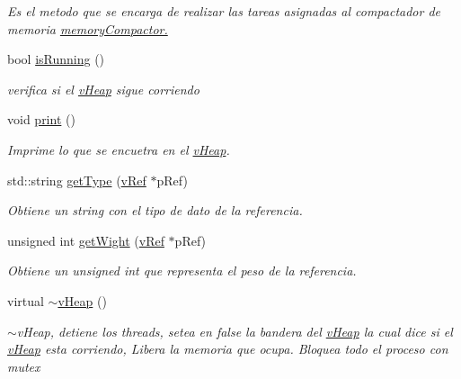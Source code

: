 \begin{DoxyCompactItemize}
\begin{DoxyCompactList}\small\item\em Es el metodo que se encarga de realizar las tareas asignadas al compactador de memoria \hyperlink{}{memory\-Compactor.}\end{DoxyCompactList}\item 
bool \hyperlink{classv_heap_a4e451a077578bc4e286de41a0b3ebe33}{is\-Running} ()
\begin{DoxyCompactList}\small\item\em verifica si el \hyperlink{classv_heap}{v\-Heap} sigue corriendo \end{DoxyCompactList}\item 
\hypertarget{classv_heap_aea047ac5e0f6cc9c8ac39a8984c8cedc}{void \hyperlink{classv_heap_aea047ac5e0f6cc9c8ac39a8984c8cedc}{print} ()}\label{classv_heap_aea047ac5e0f6cc9c8ac39a8984c8cedc}

\begin{DoxyCompactList}\small\item\em Imprime lo que se encuetra en el \hyperlink{classv_heap}{v\-Heap}. \end{DoxyCompactList}\item 
std\-::string \hyperlink{classv_heap_af6967e0e004d4ae78c88363878ae96a3}{get\-Type} (\hyperlink{classv_ref}{v\-Ref} $\ast$p\-Ref)
\begin{DoxyCompactList}\small\item\em Obtiene un string con el tipo de dato de la referencia. \end{DoxyCompactList}\item 
unsigned int \hyperlink{classv_heap_ae9f9f3ed79f45beb7b47e88a590fac61}{get\-Wight} (\hyperlink{classv_ref}{v\-Ref} $\ast$p\-Ref)
\begin{DoxyCompactList}\small\item\em Obtiene un unsigned int que representa el peso de la referencia. \end{DoxyCompactList}\item 
\hypertarget{classv_heap_a8bbcf6e79d6d28f16a1de164619e04ef}{virtual \hyperlink{classv_heap_a8bbcf6e79d6d28f16a1de164619e04ef}{$\sim$v\-Heap} ()}\label{classv_heap_a8bbcf6e79d6d28f16a1de164619e04ef}

\begin{DoxyCompactList}\small\item\em $\sim$v\-Heap, detiene los threads, setea en false la bandera del \hyperlink{classv_heap}{v\-Heap} la cual dice si el \hyperlink{classv_heap}{v\-Heap} esta corriendo, Libera la memoria que ocupa. Bloquea todo el proceso con mutex \end{DoxyCompactList}\end{DoxyCompactItemize}
